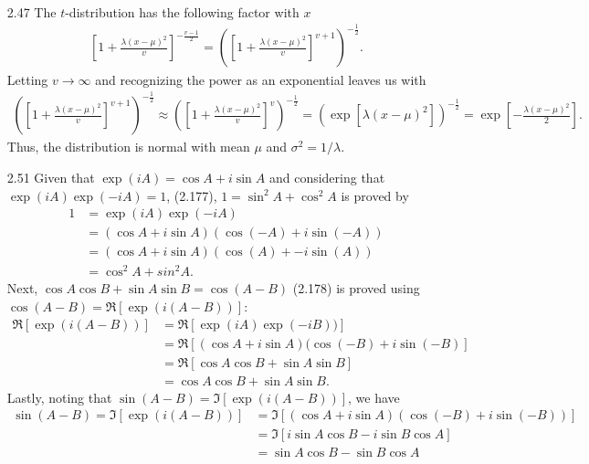 \documentclass[]{article}
\begin{document}
\begin{enumerate}
\begin{align*}
	\end{align*}
	\item[2.47] The $t$-distribution has the following factor with $x$
	\begin{align*}
	\left[1 + \frac{\lambda(x - \mu)^2}{v}\right]^{- \frac{v - 1}{2}} = \left(\left[1 + \frac{\lambda(x - \mu)^2}{v}\right]^{v+1}\right)^{-\frac{1}{2}}.
	\end{align*}
	Letting $v \rightarrow \infty$ and recognizing the power as an exponential leaves us with
	\begin{align*}
		\left(\left[1 + \frac{\lambda(x - \mu)^2}{v}\right]^{v+1}\right)^{-\frac{1}{2}} \approx 	\left(\left[1 + \frac{\lambda(x - \mu)^2}{v}\right]^v\right)^{-\frac{1}{2}}=\left(\exp \left[ \lambda(x - \mu)^2 \right] \right)^{-\frac{1}{2}}=\exp \left[-\frac{\lambda(x - \mu)^2}{2}\right].
	\end{align*}
	Thus, the distribution is normal with mean $\mu$ and $\sigma^2 = 1/\lambda$.
	\item[2.51] Given that $\exp(iA)=\cos A + i \sin A$ and considering that $\exp(iA)\exp(-iA)=1$, (2.177), $1 = \sin^2 A + \cos^2 A$ is proved by
	\begin{align*}
	1 &= \exp(iA)\exp(-iA) \\
	&= (\cos A + i \sin A)(\cos (-A) + i \sin (-A)) \\
	&= (\cos A + i \sin A)(\cos (A) + -i \sin (A)) \\
	&= \cos^2 A + sin^2 A.
	\end{align*}
	Next, $\cos A \cos B + \sin A \sin B = \cos (A - B)$ (2.178) is proved using $\cos (A - B) = \Re \left[ \exp(i(A-B)) \right]$:
	\begin{align*}
	\Re \left[ \exp(i(A-B)) \right] &= \Re \left[ \exp(iA)\exp(-iB)) \right] \\
	&= \Re \left[ (\cos A + i\sin A)(\cos (-B) + i \sin(-B) \right] \\
	&= \Re \left[ \cos A \cos B + \sin A \sin B \right] \\
	&= \cos A \cos B + \sin A \sin B.
	\end{align*}
	Lastly, noting that $\sin (A - B) = \Im \left[ \exp(i(A - B)) \right]$, we have
	\begin{align*}
	\sin (A - B) = \Im \left[ \exp(i(A - B)) \right] &= \Im \left[ (\cos A + i \sin A)(\cos (-B) + i \sin(-B)) \right] \\
	&= \Im \left[ i \sin A \cos B - i\sin B \cos A \right] \\
	&= \sin A \cos B - \sin B \cos A
	\end{align*}

\end{enumerate}
\end{document}
